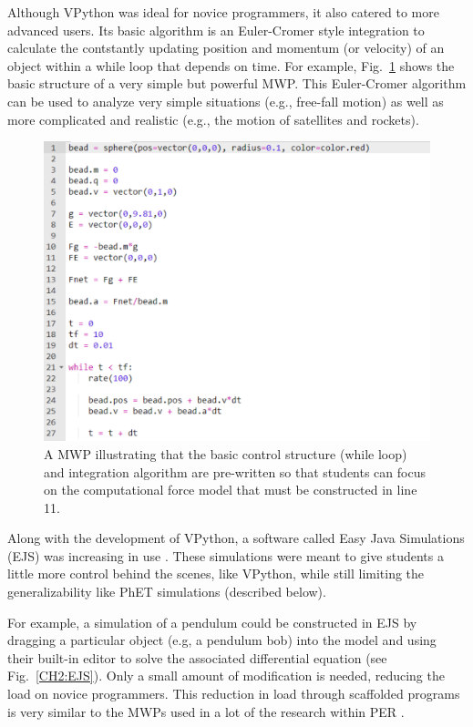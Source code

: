 \documentclass{msuphddissertation}
\begin{document}
\begin{doublespace}
Although VPython was ideal for novice programmers, it also catered to more advanced users.  Its basic algorithm is an Euler-Cromer style integration to calculate the contstantly updating position and momentum (or velocity) of an object within a while loop that depends on time.  For example, Fig.~\ref{CH2:MWP} shows the basic structure of a very simple but powerful MWP.  This Euler-Cromer algorithm can be used to analyze very simple situations (e.g., free-fall motion) as well as more complicated and realistic (e.g., the motion of satellites and rockets).

\begin{figure}\center
\includegraphics[scale=0.60]{images/CH2MWP.pdf}
\caption{A MWP illustrating that the basic control structure (while loop) and integration algorithm are pre-written so that students can focus on the computational force model that must be constructed in line 11.}\label{CH2:MWP}
\end{figure}

Along with the development of VPython, a software called Easy Java Simulations (EJS) was increasing in use \cite{Esquembre2005}.  These simulations were meant to give students a little more control behind the scenes, like VPython, while still limiting the generalizability like PhET simulations (described below).

For example, a simulation of a pendulum could be constructed in EJS by dragging a particular object (e.g, a pendulum bob) into the model and using their built-in editor to solve the associated differential equation (see Fig.~\ref{CH2:EJS}).  Only a small amount of modification is needed, reducing the load on novice programmers.  This reduction in load through scaffolded programs is very similar to the MWPs used in a lot of the research within PER \cite{Weatherford2011}.


\end{doublespace}
\end{document}
